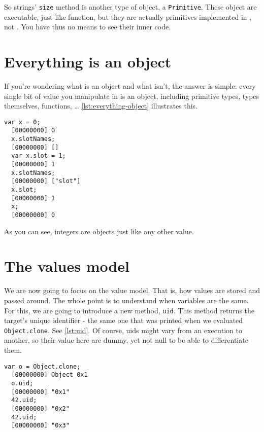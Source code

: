 \documentclass[openright,twoside,12pt]{report}
\newcommand{\lst}[1]{\autoref{lst:#1}}
\begin{document}
So strings' \texttt{size} method is another type of object, a
\texttt{Primitive}. These object are executable, just like function,
but they are actually primitives implemented in \Cxx, not \urbi. You
have thus no means to see their inner code.

\section{Everything is an object}

If you're wondering what is an object and what isn't, the answer is
simple: every single bit of value you manipulate in \urbi is an
object, including primitive types, types themselves, functions, \ldots
\lst{everything-object} illustrates this.

\begin{lstlisting}[caption=Everything is an object,
  label=lst:everything-object]
  var x = 0;
  [00000000] 0
  x.slotNames;
  [00000000] []
  var x.slot = 1;
  [00000000] 1
  x.slotNames;
  [00000000] ["slot"]
  x.slot;
  [00000000] 1
  x;
  [00000000] 0
\end{lstlisting}

As you can see, integers are objects just like any other value.

\section{The \urbi values model}

We are now going to focus on the \urbi value model. That is, how
values are stored and passed around. The whole point is to understand
when variables are the same. For this, we are going to introduce a new
method, \texttt{uid}. This method returns the target's unique
identifier - the same one that was printed when we evaluated
\lstinline|Object.clone|. See \lst{uid}. Of course, uids might vary
from an execution to another, so their value here are dummy, yet not
null to be able to differentiate them.

\begin{lstlisting}[caption=Uids, label=lst:uid]
  var o = Object.clone;
  [00000000] Object_0x1
  o.uid;
  [00000000] "0x1"
  42.uid;
  [00000000] "0x2"
  42.uid;
  [00000000] "0x3"
\end{lstlisting}
\end{document}
